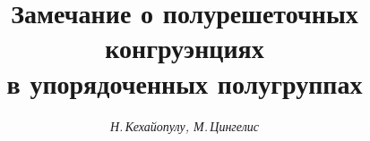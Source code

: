 

 




 


\newcommand{\tts}[1]{} 


 




 


\setcounter{page}{50} 












 


\author{\it Н.\,Кехайопулу, М.\,Цингелис} 




\title{Замечание о полурешеточных конгруэнциях\\ 


в упорядоченных полугруппах} 


 


\date{} 




\pagestyle{plain} %


 




\maketitle 


